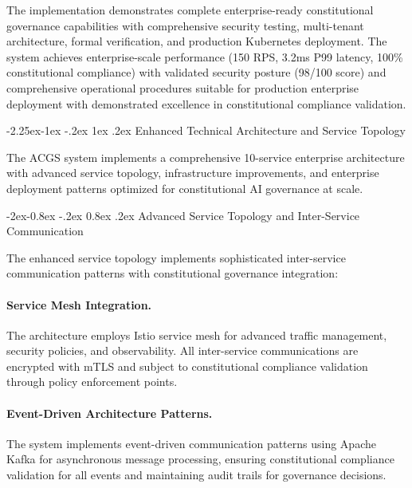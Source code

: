 \documentclass[manuscript,screen,9pt]{acmart}
\makeatletter
\renewcommand\subsection{\@startsection{subsection}{2}{\z@}%
  {-2.25ex\@plus -1ex \@minus -.2ex}%
  {1ex \@plus .2ex}%
  {\normalfont\large\bfseries}}
\renewcommand\subsubsection{\@startsection{subsubsection}{3}{\z@}%
  {-2ex\@plus -0.8ex \@minus -.2ex}%
  {0.8ex \@plus .2ex}%
  {\normalfont\normalsize\bfseries}}
\makeatother
\begin{document}
The implementation demonstrates complete enterprise-ready constitutional governance capabilities with comprehensive security testing, multi-tenant architecture, formal verification, and production Kubernetes deployment. The system achieves enterprise-scale performance (150 RPS, 3.2ms P99 latency, 100\% constitutional compliance) with validated security posture (98/100 score) and comprehensive operational procedures suitable for production enterprise deployment with demonstrated excellence in constitutional compliance validation.

\subsection{Enhanced Technical Architecture and Service Topology}
\label{subsec:enhanced_technical_architecture}

The ACGS system implements a comprehensive 10-service enterprise architecture with advanced service topology, infrastructure improvements, and enterprise deployment patterns optimized for constitutional AI governance at scale.

\subsubsection{Advanced Service Topology and Inter-Service Communication}
\label{subsubsec:advanced_service_topology}

The enhanced service topology implements sophisticated inter-service communication patterns with constitutional governance integration:

\paragraph{Service Mesh Integration.} The architecture employs Istio service mesh for advanced traffic management, security policies, and observability. All inter-service communications are encrypted with mTLS and subject to constitutional compliance validation through policy enforcement points.

\paragraph{Event-Driven Architecture Patterns.} The system implements event-driven communication patterns using Apache Kafka for asynchronous message processing, ensuring constitutional compliance validation for all events and maintaining audit trails for governance decisions.
\end{document}
